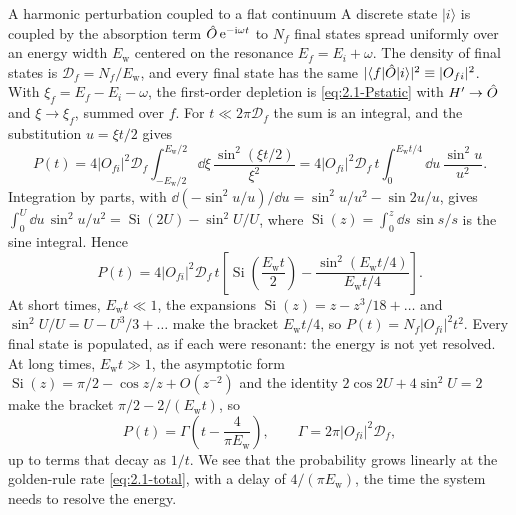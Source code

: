 \begin{workedexample}{A harmonic perturbation coupled to a flat continuum}\label{we:2-continuum}
A discrete state $|i\rangle$ is coupled by the absorption term $\hat{O}\,\mathrm{e}^{-\mathrm{i}\omega t}$ to $N_f$ final states spread uniformly over an energy width $E_{\mathrm{w}}$ centered on the resonance $E_f = E_i + \omega$. The density of final states is $\mathcal{D}_f = N_f/E_{\mathrm{w}}$, and every final state has the same $|\langle f|\hat{O}|i\rangle|^2 \equiv |O_{fi}|^2$. With $\xi_f = E_f - E_i - \omega$, the first-order depletion is \cref{eq:2.1-Pstatic} with $H' \to \hat{O}$ and $\xi \to \xi_f$, summed over $f$. For $t \ll 2\pi\mathcal{D}_f$ the sum is an integral, and the substitution $u = \xi t/2$ gives
\begin{equation*}
  P(t) = 4|O_{fi}|^2\mathcal{D}_f\int_{-E_{\mathrm{w}}/2}^{E_{\mathrm{w}}/2}\dd\xi\,\frac{\sin^2(\xi t/2)}{\xi^2}
  = 4|O_{fi}|^2\mathcal{D}_f\,t\int_0^{E_{\mathrm{w}}t/4}\dd u\,\frac{\sin^2u}{u^2} .
\end{equation*}
Integration by parts, with $\dd(-\sin^2u/u)/\dd u = \sin^2u/u^2 - \sin 2u/u$, gives $\int_0^U\dd u\,\sin^2u/u^2 = \operatorname{Si}(2U) - \sin^2U/U$, where $\operatorname{Si}(z) = \int_0^z\dd s\,\sin s/s$ is the sine integral. Hence
\begin{equation}
  P(t) = 4|O_{fi}|^2\mathcal{D}_f\,t\left[\operatorname{Si}\!\left(\frac{E_{\mathrm{w}}t}{2}\right) - \frac{\sin^2(E_{\mathrm{w}}t/4)}{E_{\mathrm{w}}t/4}\right].
  \label{eq:2.1-WEP}
\end{equation}
At short times, $E_{\mathrm{w}}t \ll 1$, the expansions $\operatorname{Si}(z) = z - z^3/18 + \dots$ and $\sin^2U/U = U - U^3/3 + \dots$ make the bracket $E_{\mathrm{w}}t/4$, so $P(t) = N_f|O_{fi}|^2t^2$. Every final state is populated, as if each were resonant: the energy is not yet resolved. At long times, $E_{\mathrm{w}}t \gg 1$, the asymptotic form $\operatorname{Si}(z) = \pi/2 - \cos z/z + O(z^{-2})$ and the identity $2\cos 2U + 4\sin^2U = 2$ make the bracket $\pi/2 - 2/(E_{\mathrm{w}}t)$, so
\begin{equation*}
  P(t) = \varGamma\left(t - \frac{4}{\pi E_{\mathrm{w}}}\right), \qquad \varGamma = 2\pi|O_{fi}|^2\mathcal{D}_f ,
\end{equation*}
up to terms that decay as $1/t$. We see that the probability grows linearly at the golden-rule rate \cref{eq:2.1-total}, with a delay of $4/(\pi E_{\mathrm{w}})$, the time the system needs to resolve the energy.


\end{workedexample}
